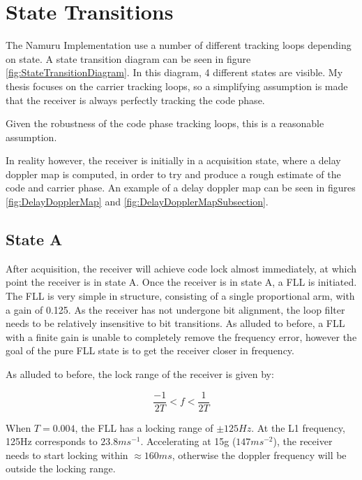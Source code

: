 \label{app3}
\chapter{State Transitions}



The Namuru Implementation use a number of different tracking loops depending on state. A state transition diagram can be seen in figure \ref{fig:StateTransitionDiagram}. In this diagram, 4 different states are visible. My thesis focuses on the carrier tracking loops, so a simplifying assumption is made that the receiver is always perfectly tracking the code phase. 

Given the robustness of the code phase tracking loops, this is a reasonable assumption.

In reality however, the receiver is initially in a acquisition state, where a delay doppler map is computed, in order to try and produce a rough estimate of the code and carrier phase.  An example of a delay doppler map can be seen in figures \ref{fig:DelayDopplerMap} and \ref{fig:DelayDopplerMapSubsection}.


\section{State A}
After acquisition, the receiver will achieve code lock almost immediately, at which point the receiver is in state A. Once the receiver is in state A, a FLL is initiated. The FLL is very simple in structure, consisting of a single proportional arm, with a gain of 0.125. As the receiver has not undergone bit alignment, the loop filter needs to be relatively insensitive to bit transitions. As alluded to before, a FLL with a finite gain is unable to completely remove the frequency error, however the goal of the pure FLL state is to get the receiver closer in frequency.

As alluded to before, the lock range of the receiver is given by:

\begin{equation}
\frac{-1}{2T} < f < \frac{1}{2T}
\end{equation}

When $T = 0.004$, the FLL has a locking range of $\pm 125Hz$. At the L1 frequency, 125Hz corresponds to $23.8ms^{-1}$. Accelerating at 15g ($147ms^{-2}$), the receiver needs to start locking within $\approx 160ms$, otherwise the doppler frequency will be outside the locking range.

